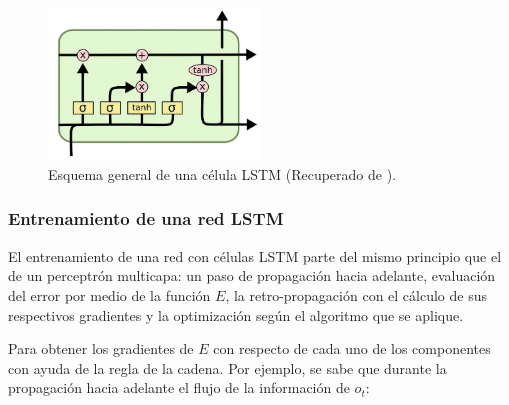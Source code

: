 \begin{figure}[h]
    \centering
    \includegraphics[width=0.5\textwidth]{Figuras/redes_neuronales/diagrama_celda_LSTM.png}
    \caption{Esquema general de una célula LSTM (Recuperado de \cite{understanding_lstm_Olah}).} 
    \label{fig:diagrama_LSTM}
\end{figure}


\subsubsection{Entrenamiento de una red LSTM}

El entrenamiento de una red con células LSTM parte del mismo principio que el de un perceptrón multicapa: un paso de propagación hacia adelante, evaluación del error por medio de la función $E$, la retro-propagación con el cálculo de sus respectivos gradientes y la optimización según el algoritmo que se aplique.

Para obtener los gradientes de $E$ con respecto de cada uno de los componentes con ayuda de la regla de la cadena. Por ejemplo, se sabe que durante la propagación hacia adelante el flujo de la información de $o_t$:

